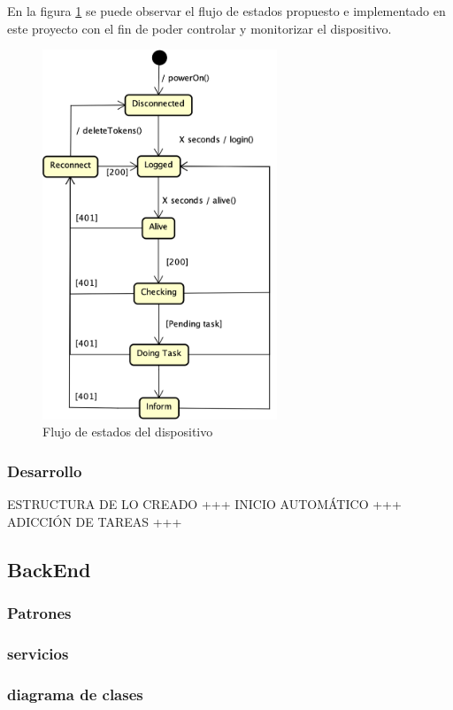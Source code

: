 En la figura \ref{fig:prototype-flow} se puede observar el flujo de estados propuesto e implementado en este proyecto con el fin de poder controlar y monitorizar el dispositivo.

\begin{figure}[h!]
    \centering
    \includegraphics[width=7cm]{./img/state/prototype-flow.png}
    \caption{Flujo de estados del dispositivo}
    \label{fig:prototype-flow}
\end{figure}

\subsubsection{Desarrollo}

ESTRUCTURA DE LO CREADO +++
INICIO AUTOMÁTICO +++
ADICCIÓN DE TAREAS +++

\subsection{BackEnd}


    \subsubsection{Patrones}
    
    \subsubsection{servicios}
    
    \subsubsection{diagrama de clases}
    
